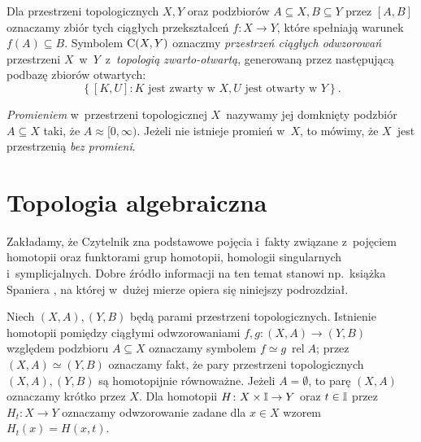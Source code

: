 Dla przestrzeni topologicznych $X,Y$ oraz podzbiorów $A\subseteq X, B\subseteq Y$ przez $[A,B]$ oznaczamy zbiór tych ciągłych przekształceń $f\colon X\to Y$, które spełniają warunek $f(A)\subseteq B$. Symbolem $\operatorname{C}(X,Y)$ oznaczmy \textit{przestrzeń ciągłych odwzorowań} przestrzeni $X$~w~$Y$~z~\textit{topologią zwarto-otwartą}, generowaną przez następującą podbazę zbiorów otwartych: \[\left\{[K,U]:K\text{ jest zwarty w } X, U\text{ jest otwarty w }Y\right\}.\]

\textit{Promieniem} w~przestrzeni topologicznej $X$~nazywamy jej domknięty podzbiór $A\subseteq X$ taki, że $A\approx [0,\infty)$. Jeżeli nie istnieje promień w~$X$, to mówimy, że $X$~jest przestrzenią \textit{bez promieni}.










\section{Topologia algebraiczna}
Zakładamy, że Czytelnik zna podstawowe pojęcia i~fakty związane z~pojęciem homotopii oraz funktorami grup homotopii, homologii singularnych i~symplicjalnych. Dobre źródło informacji na ten temat stanowi np.~książka Spaniera \cite{Spanier81}, na której w~dużej mierze opiera się niniejszy podrozdział.

Niech $(X,A), (Y,B)$ będą parami przestrzeni topologicznych. Istnienie homotopii pomiędzy ciągłymi odwzorowaniami $f, g\colon (X,A)\to (Y,B)$ względem podzbioru $A\subseteq X$ oznaczamy symbolem $f \simeq g\ \operatorname{rel} A$; przez $(X,A)\simeq (Y,B)$ oznaczamy fakt, że pary przestrzeni topologicznych $(X,A), (Y,B)$ są homotopijnie równoważne. Jeżeli $A=\emptyset$, to parę $(X,A)$ oznaczamy krótko przez $X$. Dla homotopii $H\colon X\times \mathbb{I}\to Y$ oraz $t\in \mathbb{I}$ przez $H_t\colon X\to Y$ oznaczamy odwzorowanie zadane dla $x\in X$ wzorem $H_t(x)=H(x,t)$.

